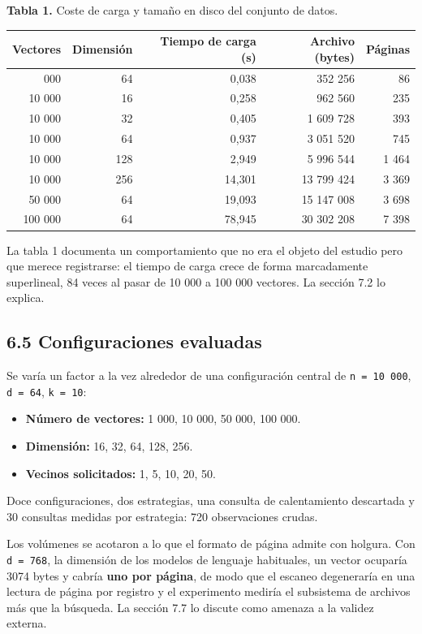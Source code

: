 \documentclass[11pt,a4paper]{article}
\providecommand{\tightlist}{%
  \setlength{\itemsep}{0pt}\setlength{\parskip}{0pt}}
\let\pandocsubsection\subsection
\let\subsection\section
\let\subsubsection\pandocsubsection
\begin{document}
\textbf{Tabla 1.} Coste de carga y tamaño en disco del conjunto de
datos.

\begin{longtable}[]{@{}rrrrr@{}}
\toprule\noalign{}
Vectores & Dimensión & Tiempo de carga (s) & Archivo (bytes) &
Páginas \\
\midrule\noalign{}
\endhead
\bottomrule\noalign{}
\endlastfoot
1 000 & 64 & 0,038 & 352 256 & 86 \\
10 000 & 16 & 0,258 & 962 560 & 235 \\
10 000 & 32 & 0,405 & 1 609 728 & 393 \\
10 000 & 64 & 0,937 & 3 051 520 & 745 \\
10 000 & 128 & 2,949 & 5 996 544 & 1 464 \\
10 000 & 256 & 14,301 & 13 799 424 & 3 369 \\
50 000 & 64 & 19,093 & 15 147 008 & 3 698 \\
100 000 & 64 & 78,945 & 30 302 208 & 7 398 \\
\end{longtable}

La tabla 1 documenta un comportamiento que no era el objeto del estudio
pero que merece registrarse: el tiempo de carga crece de forma
marcadamente superlineal, 84 veces al pasar de 10 000 a 100 000
vectores. La sección 7.2 lo explica.

\subsubsection{6.5 Configuraciones
evaluadas}\label{65-configuraciones-evaluadas}

Se varía un factor a la vez alrededor de una configuración central de
\texttt{n\ =\ 10\ 000}, \texttt{d\ =\ 64}, \texttt{k\ =\ 10}:

\begin{itemize}
\tightlist
\item
  \textbf{Número de vectores:} 1 000, 10 000, 50 000, 100 000.
\item
  \textbf{Dimensión:} 16, 32, 64, 128, 256.
\item
  \textbf{Vecinos solicitados:} 1, 5, 10, 20, 50.
\end{itemize}

Doce configuraciones, dos estrategias, una consulta de calentamiento
descartada y 30 consultas medidas por estrategia: 720 observaciones
crudas.

Los volúmenes se acotaron a lo que el formato de página admite con
holgura. Con \texttt{d\ =\ 768}, la dimensión de los modelos de lenguaje
habituales, un vector ocuparía 3074 bytes y cabría \textbf{uno por
página}, de modo que el escaneo degeneraría en una lectura de página por
registro y el experimento mediría el subsistema de archivos más que la
búsqueda. La sección 7.7 lo discute como amenaza a la validez externa.
\end{document}
